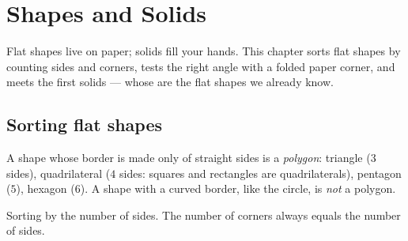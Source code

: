 \chapter{Shapes and Solids}\label{ch:g2:shapes}

Flat shapes live on paper; solids fill your hands. This chapter
sorts flat shapes by counting sides and corners, tests the right
angle with a folded paper corner, and meets the first solids ---
whose  are the flat shapes we already know.

\section{Sorting flat shapes}

\begin{definition}\label{def:g2:shapes:sort}
A shape whose border is made only of straight sides is a
\emph{polygon}: triangle ($3$ sides), quadrilateral ($4$ sides:
squares and rectangles are quadrilaterals), pentagon ($5$),
hexagon ($6$). A shape with a curved border, like the circle, is
\emph{not} a polygon.
\end{definition}

\begin{omfigure}

{\small Sorting by the number of sides. The number of corners always
equals the number of sides.}
\end{omfigure}

